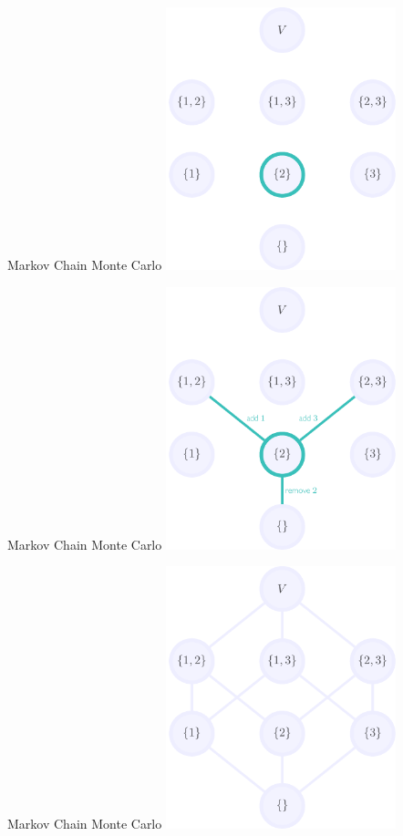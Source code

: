 \documentclass[mathserif]{beamer}
\begin{document}
\begin{frame}{Markov Chain Monte Carlo}
\vspace{0.5em}
\centering
\includegraphics[height=3in]{figures/lattice_example_node.pdf}
\end{frame}

\begin{frame}{Markov Chain Monte Carlo}
\vspace{0.5em}
\centering
\includegraphics[height=3in]{figures/lattice_example_edges.pdf}
\end{frame}

\begin{frame}{Markov Chain Monte Carlo}
\vspace{0.5em}
\centering
\includegraphics[height=3in]{figures/lattice_full.pdf}
\end{frame}
\end{document}
